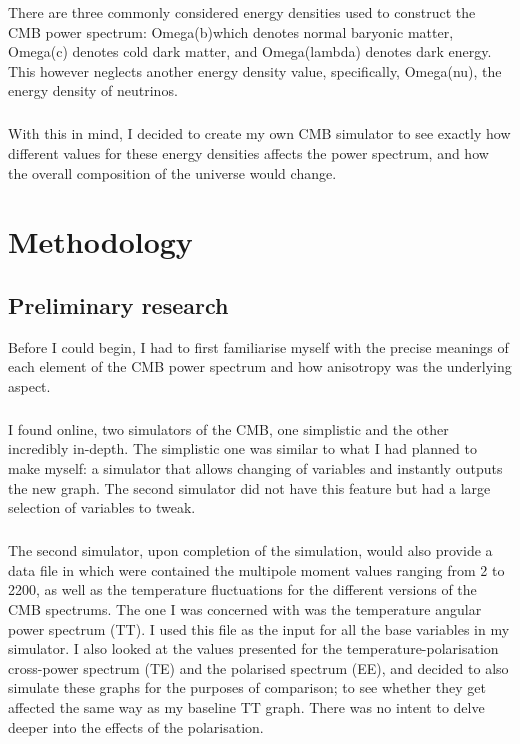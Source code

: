 \documentclass[twoside, fontsize=12pt,
     bibliography=totoc, %
     listof=totoc, %
     index=totoc, %
     onehalfspacing %
]{_MScDiss2017_cls}
\begin{document}
There are three commonly considered energy densities used to construct the CMB power spectrum: Omega(b)which denotes normal baryonic matter, Omega(c) denotes cold dark matter, and Omega(lambda) denotes dark energy. This however neglects another energy density value, specifically, Omega(nu), the energy density of neutrinos. 

\paragraph{}

With this in mind, I decided to create my own CMB simulator to see exactly how different values for these energy densities affects the power spectrum, and how the overall composition of the universe would change.

\chapter{Methodology}

\section{Preliminary research}
Before I could begin, I had to first familiarise myself with the precise meanings of each element of the CMB power spectrum and how anisotropy was the underlying aspect.

\paragraph{}

I found online, two simulators of the CMB, one simplistic and the other incredibly in-depth. The simplistic one was similar to what I had planned to make myself: a simulator that allows changing of variables and instantly outputs the new graph. The second simulator did not have this feature but had a large selection of variables to tweak.

\paragraph{}

The second simulator, upon completion of the simulation, would also provide a data file in which were contained the multipole moment values ranging from 2 to 2200, as well as the temperature fluctuations for the different versions of the CMB spectrums. The one I was concerned with was the temperature angular power spectrum (TT). I used this file as the input for all the base variables in my simulator. I also looked at the values presented  for the temperature-polarisation cross-power spectrum (TE) and the polarised spectrum (EE), and decided to also simulate these graphs for the purposes of comparison; to see whether they get affected the same way as my baseline TT graph. There was no intent to delve deeper into the effects of the polarisation.
\end{document}

